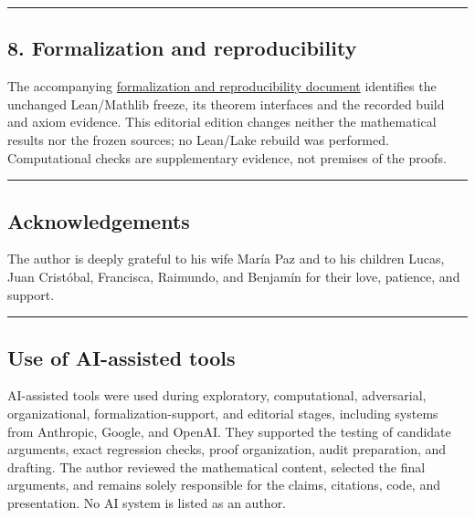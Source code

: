 \documentclass[english,11pt,a4paper]{article}
\begin{document}
\begin{center}\rule{0.5\linewidth}{0.5pt}\end{center}

\subsection{8. Formalization and
reproducibility}\label{formalization-and-reproducibility}

The accompanying
\href{https://github.com/jtraverso/erdos-81-chordal-clique-partitions/blob/main/preprints/PAPER_II/05_formalization/FORMALIZATION_COMPANION_v1.3_en.pdf}{formalization
and reproducibility document} identifies the unchanged Lean/Mathlib
freeze, its theorem interfaces and the recorded build and axiom
evidence. This editorial edition changes neither the mathematical
results nor the frozen sources; no Lean/Lake rebuild was performed.
Computational checks are supplementary evidence, not premises of the
proofs.

\begin{center}\rule{0.5\linewidth}{0.5pt}\end{center}

\subsection{Acknowledgements}\label{acknowledgements}

The author is deeply grateful to his wife María Paz and to his children
Lucas, Juan Cristóbal, Francisca, Raimundo, and Benjamín for their love,
patience, and support.

\begin{center}\rule{0.5\linewidth}{0.5pt}\end{center}

\subsection{Use of AI-assisted tools}\label{use-of-ai-assisted-tools}

AI-assisted tools were used during exploratory, computational,
adversarial, organizational, formalization-support, and editorial
stages, including systems from Anthropic, Google, and OpenAI. They
supported the testing of candidate arguments, exact regression checks,
proof organization, audit preparation, and drafting. The author reviewed
the mathematical content, selected the final arguments, and remains
solely responsible for the claims, citations, code, and presentation. No
AI system is listed as an author.
\end{document}
